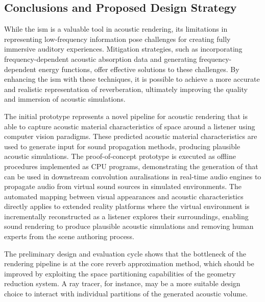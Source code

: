 \subsection{Conclusions and Proposed Design Strategy}
While the \acrshort{ism} is a valuable tool in acoustic rendering, its limitations in representing low-frequency information pose challenges for creating fully immersive auditory experiences. Mitigation strategies, such as incorporating frequency-dependent acoustic absorption data and generating frequency-dependent energy functions, offer effective solutions to these challenges. By enhancing the \acrshort{ism} with these techniques, it is possible to achieve a more accurate and realistic representation of reverberation, ultimately improving the quality and immersion of acoustic simulations.

The initial prototype represents a novel pipeline for acoustic rendering that is able to capture acoustic material characteristics of space around a listener using computer vision paradigms. These predicted acoustic material characteristics are used to generate input for sound propagation methods, producing plausible acoustic simulations. The proof-of-concept prototype is executed as offline procedures implemented as CPU programs, demonstrating the generation of  that can be used in downstream convolution auralisations in real-time audio engines to propagate audio from virtual sound sources in simulated environments. The automated mapping between visual appearances and acoustic characteristics directly applies to extended reality platforms where the virtual environment is incrementally reconstructed as a listener explores their surroundings, enabling sound rendering to produce plausible acoustic simulations and removing human experts from the scene authoring process. \par
The preliminary design and evaluation cycle shows that the bottleneck of the rendering pipeline is at the core reverb approximation method, which should be improved by exploiting the space partitioning capabilities of the geometry reduction system. A ray tracer, for instance, may be a more suitable design choice to interact with individual partitions of the generated acoustic volume. \par

